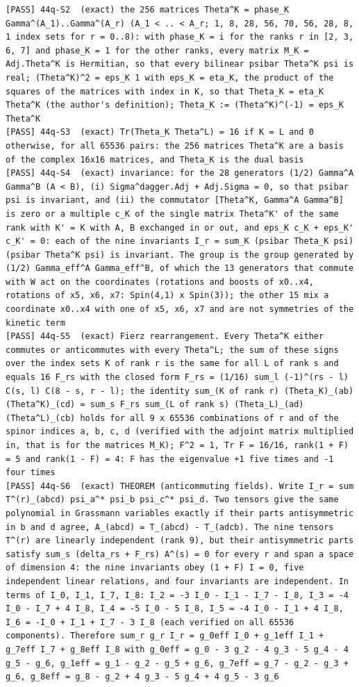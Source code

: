\documentclass[
  10pt,
]{article}
\begin{document}
\begin{verbatim}
[PASS] 44q-S2  (exact) the 256 matrices Theta^K = phase_K Gamma^(A_1)..Gamma^(A_r) (A_1 < .. < A_r; 1, 8, 28, 56, 70, 56, 28, 8, 1 index sets for r = 0..8): with phase_K = i for the ranks r in [2, 3, 6, 7] and phase_K = 1 for the other ranks, every matrix M_K = Adj.Theta^K is Hermitian, so that every bilinear psibar Theta^K psi is real; (Theta^K)^2 = eps_K 1 with eps_K = eta_K, the product of the squares of the matrices with index in K, so that Theta_K = eta_K Theta^K (the author's definition); Theta_K := (Theta^K)^(-1) = eps_K Theta^K
[PASS] 44q-S3  (exact) Tr(Theta_K Theta^L) = 16 if K = L and 0 otherwise, for all 65536 pairs: the 256 matrices Theta^K are a basis of the complex 16x16 matrices, and Theta_K is the dual basis
[PASS] 44q-S4  (exact) invariance: for the 28 generators (1/2) Gamma^A Gamma^B (A < B), (i) Sigma^dagger.Adj + Adj.Sigma = 0, so that psibar psi is invariant, and (ii) the commutator [Theta^K, Gamma^A Gamma^B] is zero or a multiple c_K of the single matrix Theta^K' of the same rank with K' = K with A, B exchanged in or out, and eps_K c_K + eps_K' c_K' = 0: each of the nine invariants I_r = sum_K (psibar Theta_K psi)(psibar Theta^K psi) is invariant. The group is the group generated by (1/2) Gamma_eff^A Gamma_eff^B, of which the 13 generators that commute with W act on the coordinates (rotations and boosts of x0..x4, rotations of x5, x6, x7: Spin(4,1) x Spin(3)); the other 15 mix a coordinate x0..x4 with one of x5, x6, x7 and are not symmetries of the kinetic term
[PASS] 44q-S5  (exact) Fierz rearrangement. Every Theta^K either commutes or anticommutes with every Theta^L; the sum of these signs over the index sets K of rank r is the same for all L of rank s and equals 16 F_rs with the closed form F_rs = (1/16) sum_l (-1)^(rs - l) C(s, l) C(8 - s, r - l); the identity sum_(K of rank r) (Theta_K)_(ab) (Theta^K)_(cd) = sum_s F_rs sum_(L of rank s) (Theta_L)_(ad) (Theta^L)_(cb) holds for all 9 x 65536 combinations of r and of the spinor indices a, b, c, d (verified with the adjoint matrix multiplied in, that is for the matrices M_K); F^2 = 1, Tr F = 16/16, rank(1 + F) = 5 and rank(1 - F) = 4: F has the eigenvalue +1 five times and -1 four times
[PASS] 44q-S6  (exact) THEOREM (anticommuting fields). Write I_r = sum T^(r)_(abcd) psi_a^* psi_b psi_c^* psi_d. Two tensors give the same polynomial in Grassmann variables exactly if their parts antisymmetric in b and d agree, A_(abcd) = T_(abcd) - T_(adcb). The nine tensors T^(r) are linearly independent (rank 9), but their antisymmetric parts satisfy sum_s (delta_rs + F_rs) A^(s) = 0 for every r and span a space of dimension 4: the nine invariants obey (1 + F) I = 0, five independent linear relations, and four invariants are independent. In terms of I_0, I_1, I_7, I_8: I_2 = -3 I_0 - I_1 - I_7 - I_8, I_3 = -4 I_0 - I_7 + 4 I_8, I_4 = -5 I_0 - 5 I_8, I_5 = -4 I_0 - I_1 + 4 I_8, I_6 = -I_0 + I_1 + I_7 - 3 I_8 (each verified on all 65536 components). Therefore sum_r g_r I_r = g_0eff I_0 + g_1eff I_1 + g_7eff I_7 + g_8eff I_8 with g_0eff = g_0 - 3 g_2 - 4 g_3 - 5 g_4 - 4 g_5 - g_6, g_1eff = g_1 - g_2 - g_5 + g_6, g_7eff = g_7 - g_2 - g_3 + g_6, g_8eff = g_8 - g_2 + 4 g_3 - 5 g_4 + 4 g_5 - 3 g_6

\end{verbatim}
\end{document}
